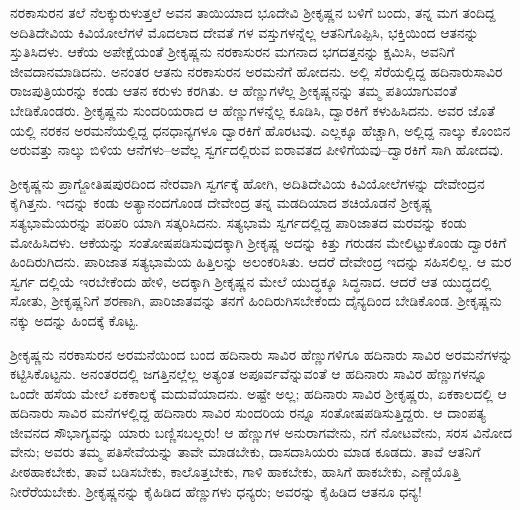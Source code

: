ನರಕಾಸುರನ ತಲೆ ನೆಲಕ್ಕುರುಳುತ್ತಲೆ ಅವನ ತಾಯಿಯಾದ ಭೂದೇವಿ ಶ್ರೀಕೃಷ್ಣನ ಬಳಿಗೆ ಬಂದು, ತನ್ನ ಮಗ ತಂದಿದ್ದ ಅದಿತಿದೇವಿಯ ಕಿವಿಯೋಲೆಗಳೆ ಮೊದಲಾದ ದೇವತೆ ಗಳ ವಸ್ತುಗಳನ್ನೆಲ್ಲ ಆತನಿಗೊಪ್ಪಿಸಿ, ಭಕ್ತಿಯಿಂದ ಆತನನ್ನು ಸ್ತುತಿಸಿದಳು. ಆಕೆಯ ಅಪೇಕ್ಷೆಯಂತೆ ಶ್ರೀಕೃಷ್ಣನು ನರಕಾಸುರನ ಮಗನಾದ ಭಗದತ್ತನನ್ನು ಕ್ಷಮಿಸಿ, ಅವನಿಗೆ ಜೀವದಾನಮಾಡಿದನು. ಅನಂತರ ಆತನು ನರಕಾಸುರನ ಅರಮನೆಗೆ ಹೋದನು. ಅಲ್ಲಿ ಸೆರೆಯಲ್ಲಿದ್ದ ಹದಿನಾರುಸಾವಿರ ರಾಜಪುತ್ರಿಯರನ್ನು ಕಂಡು ಆತನ ಕರುಳು ಕರಗಿತು. ಆ ಹೆಣ್ಣುಗಳೆಲ್ಲ ಶ್ರೀಕೃಷ್ಣನನ್ನು ತಮ್ಮ ಪತಿಯಾಗುವಂತೆ ಬೇಡಿಕೊಂಡರು. ಶ್ರೀಕೃಷ್ಣನು ಸುಂದರಿಯರಾದ ಆ ಹೆಣ್ಣುಗಳನ್ನೆಲ್ಲ ಕೂಡಿಸಿ, ದ್ವಾರಕಿಗೆ ಕಳುಹಿಸಿದನು. ಅವರ ಜೊತೆ ಯಲ್ಲಿ ನರಕನ ಅರಮನೆಯಲ್ಲಿದ್ದ ಧನಧಾನ್ಯಗಳೂ ದ್ವಾರಕಿಗೆ ಹೊರಟವು. ಎಲ್ಲಕ್ಕೂ ಹೆಚ್ಚಾಗಿ, ಅಲ್ಲಿದ್ದ ನಾಲ್ಕು ಕೊಂಬಿನ ಅರುವತ್ತು ನಾಲ್ಕು ಬಿಳಿಯ ಆನೆಗಳು–ಅವೆಲ್ಲ ಸ್ವರ್ಗದಲ್ಲಿರುವ ಐರಾವತದ ಪೀಳಿಗೆಯವು–ದ್ವಾರಕಿಗೆ ಸಾಗಿ ಹೋದವು.

ಶ್ರೀಕೃಷ್ಣನು ಪ್ರಾಗ್ಜೋತಿಷಪುರದಿಂದ ನೇರವಾಗಿ ಸ್ವರ್ಗಕ್ಕೆ ಹೋಗಿ, ಅದಿತಿದೇವಿಯ ಕಿವಿಯೋಲೆಗಳನ್ನು ದೇವೇಂದ್ರನ ಕೈಗಿತ್ತನು. ಇದನ್ನು ಕಂಡು ಅತ್ಯಾನಂದಗೊಂಡ ದೇವೇಂದ್ರ ತನ್ನ ಮಡದಿಯಾದ ಶಚಿಯೊಡನೆ ಶ್ರೀಕೃಷ್ಣ ಸತ್ಯಭಾಮೆಯರನ್ನು ಪರಿಪರಿ ಯಾಗಿ ಸತ್ಕರಿಸಿದನು. ಸತ್ಯಭಾಮೆ ಸ್ವರ್ಗದಲ್ಲಿದ್ದ ಪಾರಿಜಾತದ ಮರವನ್ನು ಕಂಡು ಮೋಹಿಸಿದಳು. ಆಕೆಯನ್ನು ಸಂತೋಷಪಡಿಸುವುದಕ್ಕಾಗಿ ಶ್ರೀಕೃಷ್ಣ ಅದನ್ನು ಕಿತ್ತು ಗರುಡನ ಮೇಲಿಟ್ಟುಕೊಂಡು ದ್ವಾರಕಿಗೆ ಹಿಂದಿರುಗಿದನು. ಪಾರಿಜಾತ ಸತ್ಯಭಾಮೆಯ ಹಿತ್ತಿಲನ್ನು ಅಲಂಕರಿಸಿತು. ಆದರೆ ದೇವೇಂದ್ರ ಇದನ್ನು ಸಹಿಸಲಿಲ್ಲ. ಆ ಮರ ಸ್ವರ್ಗ ದಲ್ಲಿಯೆ ಇರಬೇಕೆಂದು ಹೇಳಿ, ಅದಕ್ಕಾಗಿ ಶ್ರೀಕೃಷ್ಣನ ಮೇಲೆ ಯುದ್ಧಕ್ಕೂ ಸಿದ್ಧನಾದ. ಆದರೆ ಆತ ಯುದ್ಧದಲ್ಲಿ ಸೋತು, ಶ್ರೀಕೃಷ್ಣನಿಗೆ ಶರಣಾಗಿ, ಪಾರಿಜಾತವನ್ನು ತನಗೆ ಹಿಂದಿರುಗಿಸಬೇಕೆಂದು ದೈನ್ಯದಿಂದ ಬೇಡಿಕೊಂಡ. ಶ್ರೀಕೃಷ್ಣನು ನಕ್ಕು ಅದನ್ನು ಹಿಂದಕ್ಕೆ ಕೊಟ್ಟ.

ಶ್ರೀಕೃಷ್ಣನು ನರಕಾಸುರನ ಅರಮನೆಯಿಂದ ಬಂದ ಹದಿನಾರು ಸಾವಿರ ಹೆಣ್ಣುಗಳಿಗೂ ಹದಿನಾರು ಸಾವಿರ ಅರಮನೆಗಳನ್ನು ಕಟ್ಟಿಸಿಕೊಟ್ಟನು. ಅನಂತರದಲ್ಲಿ ಜಗತ್ತಿನಲ್ಲೆಲ್ಲ ಅತ್ಯಂತ ಅಪೂರ್ವವೆನ್ನುವಂತೆ ಆ ಹದಿನಾರು ಸಾವಿರ ಹೆಣ್ಣುಗಳನ್ನೂ ಒಂದೇ ಹಸೆಯ ಮೇಲೆ ಏಕಕಾಲಕ್ಕೆ ಮದುವೆಯಾದನು. ಅಷ್ಟೇ ಅಲ್ಲ; ಹದಿನಾರು ಸಾವಿರ ಶ್ರೀಕೃಷ್ಣರು, ಏಕಕಾಲದಲ್ಲಿ ಆ ಹದಿನಾರು ಸಾವಿರ ಮನೆಗಳಲ್ಲಿದ್ದ ಹದಿನಾರು ಸಾವಿರ ಸುಂದರಿಯ ರನ್ನೂ ಸಂತೋಷಪಡಿಸುತ್ತಿದ್ದರು. ಆ ದಾಂಪತ್ಯ ಜೀವನದ ಸೌಭಾಗ್ಯವನ್ನು ಯಾರು ಬಣ್ಣಿಸಬಲ್ಲರು! ಆ ಹೆಣ್ಣುಗಳ ಅನುರಾಗವೇನು, ನಗೆ ನೋಟವೇನು, ಸರಸ ವಿನೋದ ವೇನು; ಅವರು ತಮ್ಮ ಪತಿಸೇವೆಯನ್ನು ತಾವೇ ಮಾಡಬೇಕು, ದಾಸದಾಸಿಯರು ಮಾಡ ಕೂಡದು. ತಾವೆ ಆತನಿಗೆ ಪೀಠಹಾಕಬೇಕು, ತಾವೆ ಬಡಿಸಬೇಕು, ಕಾಲೊತ್ತಬೇಕು, ಗಾಳಿ ಹಾಕಬೇಕು, ಹಾಸಿಗೆ ಹಾಕಬೇಕು, ಎಣ್ಣೆಯೊತ್ತಿ ನೀರೆರೆಯಬೇಕು. ಶ್ರೀಕೃಷ್ಣನನ್ನು ಕೈಹಿಡಿದ ಹೆಣ್ಣುಗಳು ಧನ್ಯರು; ಅವರನ್ನು ಕೈಹಿಡಿದ ಆತನೂ ಧನ್ಯ!

